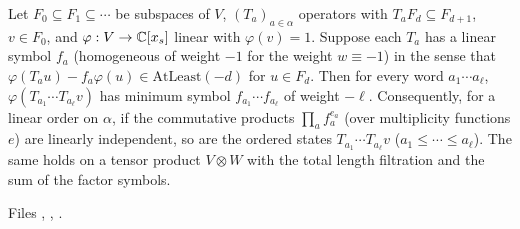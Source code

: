 \begin{theorem}\label{l11:thm:filteredwords}
Let $F_0\subseteq F_1\subseteq\cdots$ be subspaces of $V$, $(T_a)_{a\in\alpha}$ operators with $T_aF_d\subseteq F_{d+1}$,
$v\in F_0$, and $\varphi:V\to{\mathbb{C}}[x_s]$ linear with $\varphi(v) = 1$. Suppose each $T_a$ has a linear symbol $f_a$
(homogeneous of weight $-1$ for the weight $w\equiv-1$) in the sense that $\varphi(T_au)-f_a\varphi(u)\in\mathrm{AtLeast}(-d)$
for $u\in F_d$. Then for every word $a_1\cdots a_\ell$, $\varphi(T_{a_1}\cdots T_{a_\ell}v)$ has minimum symbol
$f_{a_1}\cdots f_{a_\ell}$ of weight $-\ell$. Consequently, for a linear order on $\alpha$, if the commutative products
$\prod_af_a^{e_a}$ (over multiplicity functions $e$) are linearly independent, so are the ordered states
$T_{a_1}\cdots T_{a_\ell}v$ ($a_1\le\cdots\le a_\ell$). The same holds on a tensor product $V\otimes W$ with the
total length filtration and the sum of the factor symbols.
\end{theorem}
{\sloppy \noindent Files ,
,
.\par}

